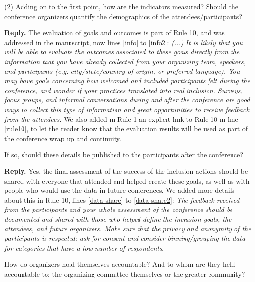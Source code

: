 \documentclass{article}
\newenvironment{Reply}{\noindent\color{BlueViolet}\textbf{Reply.}}{\vspace{1em}}
\begin{document}
(2) Adding on to the first point, how are the indicators measured? Should the conference organizers quantify the demographics of the attendees/participants? 

\begin{Reply}
The evaluation of goals and outcomes is part of Rule 10, and was addressed in the manuscript, now lines \ref{info} to \ref{info2}:
\textit{
(...) It is likely that you will be able to evaluate the outcomes associated to these goals directly from the information that you have already collected from your organizing team, speakers, and participants (e.g. city/state/country of origin, or preferred language).
You may have goals concerning how welcomed and included participants felt during the conference, and wonder if your practices translated into real inclusion. 
Surveys, focus groups, and informal conversations during and after the conference are good ways to collect this type of information and great opportunities to receive feedback from the attendees.
}
We also added in Rule 1 an explicit link to Rule 10 in line \ref{rule10}, to let the reader know that the evaluation results will be used as part of the conference wrap up and continuity. 

\end{Reply}

If so, should these details be published to the participants after the conference? 

\begin{Reply}
Yes, the final assessment of the success of the inclusion actions should be shared with everyone that attended and helped create these goals, as well as with people who would use the data in future conferences. 
We added more details about this in Rule 10, lines \ref{data-share} to \ref{data-share2}:
\textit{The feedback received from the participants and your whole assessment of the conference should be documented and shared with those who helped define the inclusion goals, the attendees, and future organizers. 
Make sure that the privacy and anonymity of the participants is respected; ask for consent and consider binning/grouping the data for categories that have a low number of respondents.}
\end{Reply}

How do organizers hold themselves accountable? And to whom are they held accountable to; the organizing committee themselves or the greater community?
\end{document}
